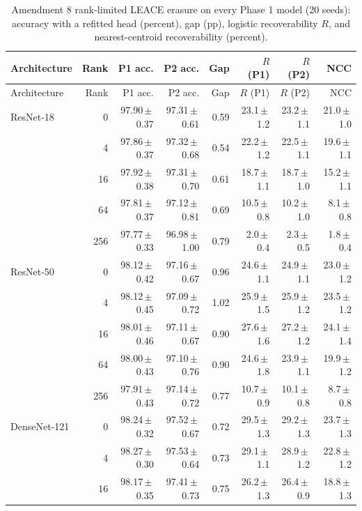 {\scriptsize
\setlength{\tabcolsep}{3.5pt}
\begin{longtable}{lrrrrrrr}
\caption{Amendment 8 rank-limited LEACE erasure on every Phase 1 model (20 seeds): accuracy with a refitted head (percent), gap (pp), logistic recoverability $R$, and nearest-centroid recoverability (percent).}\label{r:tab:leace}\\
\toprule
Architecture & Rank & P1 acc. & P2 acc. & Gap & $R$ (P1) & $R$ (P2) & NCC \\
\midrule
\endfirsthead
\toprule
Architecture & Rank & P1 acc. & P2 acc. & Gap & $R$ (P1) & $R$ (P2) & NCC \\
\midrule
\endhead
\bottomrule
\endfoot
ResNet-18 & 0 & 97.90\,$\pm$\,0.37 & 97.31\,$\pm$\,0.61 & 0.59 & 23.1\,$\pm$\,1.2 & 23.2\,$\pm$\,1.1 & 21.0\,$\pm$\,1.0 \\
 & 4 & 97.86\,$\pm$\,0.37 & 97.32\,$\pm$\,0.68 & 0.54 & 22.2\,$\pm$\,1.2 & 22.5\,$\pm$\,1.1 & 19.6\,$\pm$\,1.1 \\
 & 16 & 97.92\,$\pm$\,0.38 & 97.31\,$\pm$\,0.70 & 0.61 & 18.7\,$\pm$\,1.1 & 18.7\,$\pm$\,1.0 & 15.2\,$\pm$\,1.1 \\
 & 64 & 97.81\,$\pm$\,0.37 & 97.12\,$\pm$\,0.81 & 0.69 & 10.5\,$\pm$\,0.8 & 10.2\,$\pm$\,1.0 & 8.1\,$\pm$\,0.8 \\
 & 256 & 97.77\,$\pm$\,0.33 & 96.98\,$\pm$\,1.00 & 0.79 & 2.0\,$\pm$\,0.4 & 2.3\,$\pm$\,0.5 & 1.8\,$\pm$\,0.4 \\
ResNet-50 & 0 & 98.12\,$\pm$\,0.42 & 97.16\,$\pm$\,0.67 & 0.96 & 24.6\,$\pm$\,1.1 & 24.9\,$\pm$\,1.1 & 23.0\,$\pm$\,1.2 \\
 & 4 & 98.12\,$\pm$\,0.45 & 97.09\,$\pm$\,0.72 & 1.02 & 25.9\,$\pm$\,1.5 & 25.9\,$\pm$\,1.2 & 23.5\,$\pm$\,1.2 \\
 & 16 & 98.01\,$\pm$\,0.46 & 97.11\,$\pm$\,0.67 & 0.90 & 27.6\,$\pm$\,1.6 & 27.2\,$\pm$\,1.2 & 24.1\,$\pm$\,1.4 \\
 & 64 & 98.00\,$\pm$\,0.43 & 97.10\,$\pm$\,0.76 & 0.90 & 24.6\,$\pm$\,1.8 & 23.9\,$\pm$\,1.1 & 19.9\,$\pm$\,1.2 \\
 & 256 & 97.91\,$\pm$\,0.43 & 97.14\,$\pm$\,0.72 & 0.77 & 10.7\,$\pm$\,0.9 & 10.1\,$\pm$\,0.8 & 8.7\,$\pm$\,0.8 \\
DenseNet-121 & 0 & 98.24\,$\pm$\,0.32 & 97.52\,$\pm$\,0.67 & 0.72 & 29.5\,$\pm$\,1.3 & 29.2\,$\pm$\,1.3 & 23.7\,$\pm$\,1.3 \\
 & 4 & 98.27\,$\pm$\,0.30 & 97.53\,$\pm$\,0.64 & 0.73 & 29.1\,$\pm$\,1.1 & 28.9\,$\pm$\,1.2 & 22.8\,$\pm$\,1.2 \\
 & 16 & 98.17\,$\pm$\,0.35 & 97.41\,$\pm$\,0.73 & 0.75 & 26.2\,$\pm$\,1.3 & 26.4\,$\pm$\,0.9 & 18.8\,$\pm$\,1.3 \\

\end{longtable}}
